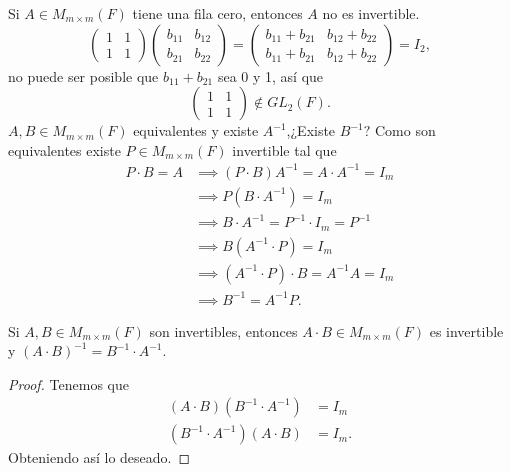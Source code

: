 \documentclass[12pt,a4paper]{book}
\begin{document}
    Si $A\in M_{m\times m}(F)$ tiene una fila cero, entonces $A$ no es invertible.
    \begin{equation*}
        \begin{pmatrix}
            1 & 1\\
            1 & 1
        \end{pmatrix}
        \begin{pmatrix}
            b_{11} & b_{12}\\
            b_{21} & b_{22}
        \end{pmatrix}
        =
        \begin{pmatrix}
            b_{11}+b_{21} & b_{12}+b_{22}\\
            b_{11}+b_{21} & b_{12}+b_{22}
        \end{pmatrix}
        =I_{2},
    \end{equation*}
    no puede ser posible que $b_{11}+b_{21}$ sea 0 y 1, así que
    \begin{equation*}
        \begin{pmatrix}
            1 & 1\\
            1 & 1
        \end{pmatrix}
        \notin GL_{2}(F).
    \end{equation*}
    $A,B\in M_{m\times m}(F)$ equivalentes y existe $A^{-1}$,¿Existe $B^{-1}?$
    Como son equivalentes existe $P\in M_{m\times m}(F)$ invertible tal que
    \begin{align*}
        P\cdot B=A&\implies (P\cdot B)A^{-1}=A\cdot A^{-1}=I_{m}\\
        &\implies P(B\cdot A^{-1})=I_{m}\\
        &\implies B\cdot A^{-1}=P^{-1}\cdot I_{m}=P^{-1}\\
        &\implies B(A^{-1}\cdot P)=I_{m}\\
        &\implies (A^{-1}\cdot P)\cdot B=A^{-1}A=I_{m}\\
        &\implies B^{-1}=A^{-1}P.
    \end{align*}

    \begin{lema}
        Si $A,B\in M_{m\times m}(F)$ son invertibles, entonces $A\cdot B\in M_{m\times m}(F)$
        es invertible y $(A\cdot B)^{-1}=B^{-1}\cdot A^{-1}$.
    \end{lema}
    
    \begin{proof}
        Tenemos que
        \begin{align*}
            (A\cdot B)(B^{-1}\cdot A^{-1})&=I_{m}\\
            (B^{-1}\cdot A^{-1})(A\cdot B)&=I_{m}.
        \end{align*}
        Obteniendo así lo deseado.
    \end{proof}
\end{document}
